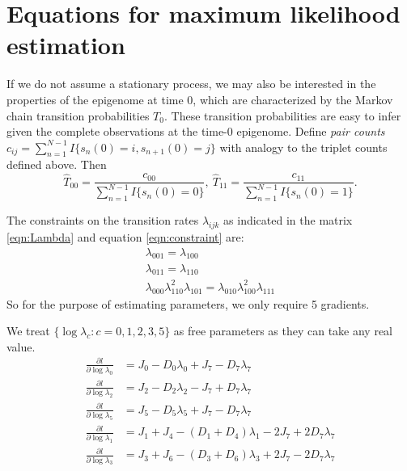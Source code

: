 \documentclass[11pt]{article}
\begin{document}
\clearpage




\clearpage

\appendix

\section{Equations for maximum likelihood estimation}

If we do not assume a stationary process, we may also be interested in
the properties of the epigenome at time 0, which are characterized by
the Markov chain transition
probabilities $T_{0}$. These transition probabilities are easy to
infer given the complete observations at the time-0 epigenome.  Define
{\it pair counts} $c_{ij} = \sum_{n=1}^{N-1}I\{s_n(0) =i,
s_{n+1}(0)=j\}$ with analogy to the triplet counts defined above. Then
\[
\hat{T}_{00} = \frac{c_{00}}{\sum_{n=1}^{N-1}I\{s_n(0) = 0\}}, ~
\hat{T}_{11} = \frac{c_{11}}{\sum_{n=1}^{N-1}I\{s_n(0) = 1\}}.
\]

The constraints on the transition rates $\lambda_{ijk}$ as indicated
in the matrix \eqref{eqn:Lambda} and equation \eqref{eqn:constraint}
are:
\begin{equation}\label{eqn:constraints}
  \begin{array}{c}
    \lambda_{001} = \lambda_{100}\\
    \lambda_{011} = \lambda_{110}\\
    \lambda_{000}\lambda_{110}^2\lambda_{101} = \lambda_{010}\lambda_{100}^2\lambda_{111}
  \end{array}
\end{equation}
So for the purpose of estimating parameters, we only require 5
gradients.

We treat $\{\log\lambda_c: c = 0,1,2,3,5\}$ as free parameters as they
can take any real value.
\begin{equation}
  \begin{aligned}
    \frac{\partial l}{\partial \log\lambda_0} &= J_0 - D_0\lambda_0 + J_7 - D_7\lambda_7\\
    \frac{\partial l}{\partial \log\lambda_2} &= J_2 - D_2\lambda_2 - J_7 + D_7\lambda_7 \\
    \frac{\partial l}{\partial \log\lambda_5} &= J_5 - D_5\lambda_5 + J_7 - D_7\lambda_7\\
    \frac{\partial l}{\partial \log\lambda_1} &= J_1 + J_4 - (D_1 + D_4)\lambda_1 - 2J_7 + 2D_7\lambda_7\\
    \frac{\partial l}{\partial \log\lambda_3} &= J_3 + J_6 - (D_3 + D_6)\lambda_3 + 2J_7 - 2D_7\lambda_7
  \end{aligned}
\end{equation}
\end{document}
